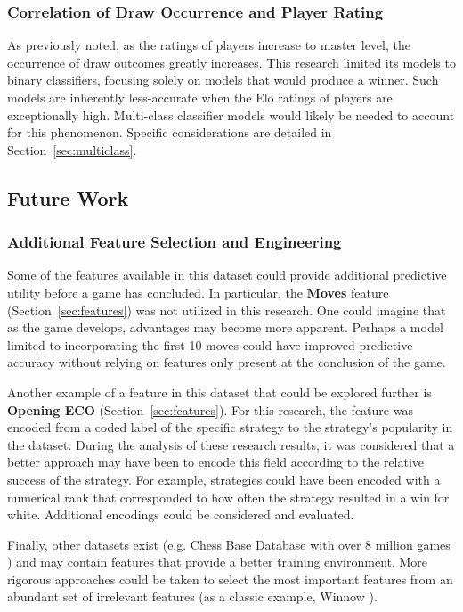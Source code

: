 \documentclass[12pt]{article}
\begin{document}
\subsubsection{Correlation of Draw Occurrence and Player Rating}
As previously noted, as the ratings of players increase to master level, the occurrence of draw outcomes greatly increases. This research limited its models to binary classifiers, focusing solely on models that would produce a winner. Such models are inherently less-accurate when the Elo ratings of players are exceptionally high. Multi-class classifier models would likely be needed to account for this phenomenon. Specific considerations are detailed in Section~\ref{sec:multiclass}.

\subsection{Future Work}

\subsubsection{Additional Feature Selection and Engineering}
\label{sec:feature-eng}
Some of the features available in this dataset could provide additional predictive utility before a game has concluded. In particular, the \textbf{Moves} feature (Section~\ref{sec:features}) was not utilized in this research. One could imagine that as the game develops, advantages may become more apparent. Perhaps a model limited to incorporating the first 10 moves could have improved predictive accuracy without relying on features only present at the conclusion of the game.

Another example of a feature in this dataset that could be explored further is \textbf{Opening ECO} (Section~\ref{sec:features}). For this research, the feature was encoded from a coded label of the specific strategy to the strategy's popularity in the dataset. During the analysis of these research results, it was considered that a better approach may have been to encode this field according to the relative success of the strategy. For example, strategies could have been encoded with a numerical rank that corresponded to how often the strategy resulted in a win for white. Additional encodings could be considered and evaluated.

Finally, other datasets exist (e.g. Chess Base Database with over 8 million games \cite{chessBaseDb}) and may contain features that provide a better training environment. More rigorous approaches could be taken to select the most important features from an abundant set of irrelevant features (as a classic example, Winnow \cite{Littlestone1988}).
\end{document}
